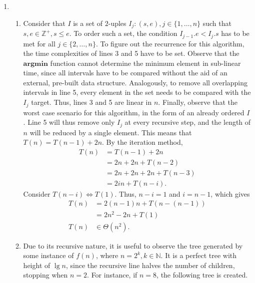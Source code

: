 \documentclass[12pt]{article}
\begin{document}
\begin{enumerate}
  \item
  \begin{enumerate}
    \item Consider that $I$ is a set of $2$-uples $I_{j} : (s, e), j \in \{1, \dots, n\}$ such that $s, e \in \mathbb{Z}^{+}, s \leq e$. To order such a set, the condition $I_{j - 1}.e < I_{j}.s$ has to be met for all $j \in \{2, \dots, n\}$. To figure out the recurrence for this algorithm, the time complexities of lines 3 and 5 have to be set. Observe that the $\textbf{argmin}$ function cannot determine the minimum element in sub-linear time, since all intervals have to be compared without the aid of an external, pre-built data structure. Analogously, to remove all overlapping intervals in line 5, every element in the set needs to be compared with the $I_{j}$ target. Thus, lines 3 and 5 are linear in $n$. Finally, observe that the worst case scenario for this algorithm, in the form of an already ordered $I$. Line 5 will thus remove only $I_{j}$ at every recursive step, and the length of $n$ will be reduced by a single element. This means that $T(n) = T(n - 1) + 2n$. By the iteration method,
    \begin{align*}
      T(n) &= T(n - 1) + 2n \\
      &= 2n + 2n + T(n - 2) \\
      &= 2n + 2n + 2n + T(n - 3) \\
      &= 2in + T(n - i).
    \end{align*}
    Consider $T(n - i) \Leftrightarrow T(1)$. Thus, $n - i = 1$ and $i = n - 1$, which gives
    \begin{align*}
      T(n) &= 2(n - 1)n + T(n - (n - 1)) \\
      &= 2n^{2} - 2n + T(1) \\
      T(n) &\in \Theta(n^{2}).
    \end{align*}
    \item Due to its recursive nature, it is useful to observe the tree generated by some instance of $f(n)$, where $n = 2^{k}, k \in \mathbb{N}$. It is a perfect tree with height of $\lg n$, since the recursive line halves the number of children, stopping when $n = 2$. For instance, if $n = 8$, the following tree is created.
    \begin{figure}[htbp]
      \centering
\end{figure}
\end{enumerate}
\end{enumerate}
\end{document}
